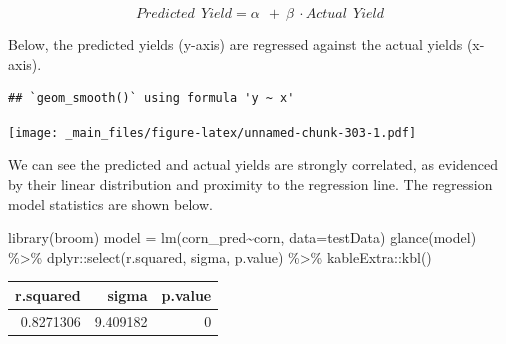 \documentclass[
]{book}
\newenvironment{Shaded}{\begin{snugshade}}{\end{snugshade}}
\newcommand{\AttributeTok}[1]{\textcolor[rgb]{0.77,0.63,0.00}{#1}}
\newcommand{\FunctionTok}[1]{\textcolor[rgb]{0.00,0.00,0.00}{#1}}
\newcommand{\NormalTok}[1]{#1}
\newcommand{\OtherTok}[1]{\textcolor[rgb]{0.56,0.35,0.01}{#1}}
\newcommand{\SpecialCharTok}[1]{\textcolor[rgb]{0.00,0.00,0.00}{#1}}
\newcommand{\StringTok}[1]{\textcolor[rgb]{0.31,0.60,0.02}{#1}}
\begin{document}
\[ Predicted \ \ Yield = \alpha \ \ + \ \beta\ \cdot Actual \ \ Yield \]

Below, the predicted yields (y-axis) are regressed against the actual yields (x-axis).

\begin{Shaded}
\end{Shaded}

\begin{verbatim}
## `geom_smooth()` using formula 'y ~ x'
\end{verbatim}

\texttt{[image: \_main\_files/figure-latex/unnamed-chunk-303-1.pdf]}

We can see the predicted and actual yields are strongly correlated, as evidenced by their linear distribution and proximity to the regression line. The regression model statistics are shown below.

\begin{Shaded}
\begin{Highlighting}[]
\FunctionTok{library}\NormalTok{(broom)}
\NormalTok{model }\OtherTok{=} \FunctionTok{lm}\NormalTok{(corn\_pred}\SpecialCharTok{\textasciitilde{}}\NormalTok{corn, }\AttributeTok{data=}\NormalTok{testData)}
\FunctionTok{glance}\NormalTok{(model) }\SpecialCharTok{\%\textgreater{}\%}
\NormalTok{  dplyr}\SpecialCharTok{::}\FunctionTok{select}\NormalTok{(r.squared, sigma, p.value) }\SpecialCharTok{\%\textgreater{}\%}
\NormalTok{  kableExtra}\SpecialCharTok{::}\FunctionTok{kbl}\NormalTok{()}
\end{Highlighting}
\end{Shaded}

\begin{tabular}[t]{r|r|r}
\hline
r.squared & sigma & p.value\\
\hline
0.8271306 & 9.409182 & 0\\
\hline
\end{tabular}
\end{document}
